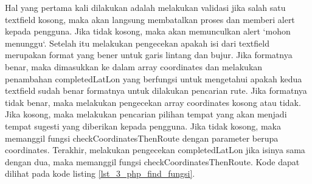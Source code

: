 Hal yang pertama kali dilakukan adalah melakukan validasi jika salah satu textfield kosong, maka akan langsung membatalkan proses dan memberi alert kepada pengguna. Jika tidak kosong, maka akan memunculkan alert `mohon menunggu`. 
Setelah itu melakukan pengecekan apakah isi dari textfield merupakan format yang bener untuk garis lintang dan bujur. Jika formatnya benar, maka dimasukkan ke dalam array coordinates dan melakukan penambahan completedLatLon yang berfungsi untuk mengetahui apakah kedua textfield sudah benar formatnya untuk dilakukan pencarian rute. Jika formatnya tidak benar, maka melakukan pengecekan array coordinates kosong atau tidak. 
Jika kosong, maka melakukan pencarian pilihan tempat yang akan menjadi tempat sugesti yang diberikan kepada pengguna. Jika tidak kosong, maka memanggil fungsi checkCoordinatesThenRoute dengan parameter berupa coordinates. Terakhir, melakukan pengecekan completedLatLon jika isinya sama dengan dua, maka memanggil fungsi checkCoordinatesThenRoute. Kode dapat dilihat pada kode listing \ref{lst_3_php_find_fungsi}.

